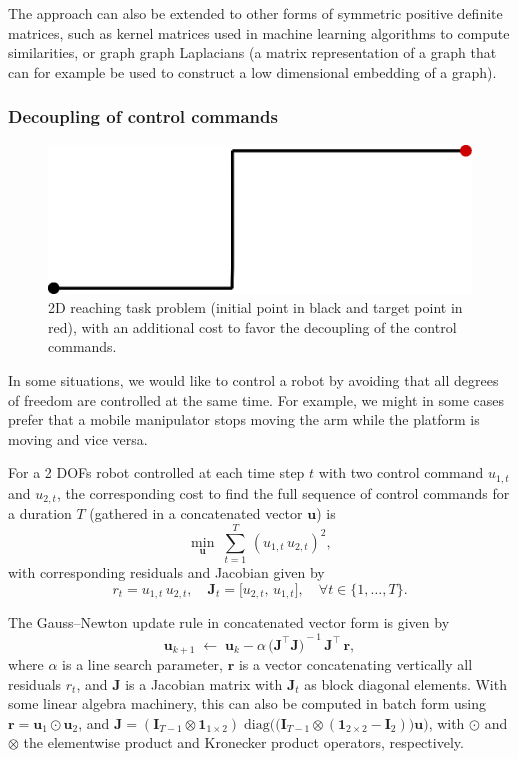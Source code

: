 \documentclass[10pt,a4paper]{article} %
\newcommand{\trsp}{{\scriptscriptstyle\top}}
\begin{document}
The approach can also be extended to other forms of symmetric positive definite matrices, such as kernel matrices used in machine learning algorithms to compute similarities, or graph graph Laplacians (a matrix representation of a graph that can for example be used to construct a low dimensional embedding of a graph).

\subsubsection{Decoupling of control commands}

\begin{figure}
\centering
\includegraphics[width=.20\textwidth]{images/iLQR_decoupling01.png}
\caption{\footnotesize
2D reaching task problem (initial point in black and target point in red), with an additional cost to favor the decoupling of the control commands.
}
\label{fig:iLQR_decoupling}
\end{figure}

In some situations, we would like to control a robot by avoiding that all degrees of freedom are controlled at the same time. For example, we might in some cases  prefer that a mobile manipulator stops moving the arm while the platform is moving and vice versa.

For a 2 DOFs robot controlled at each time step $t$ with two control command $u_{1,t}$ and $u_{2,t}$, the corresponding cost to find the full sequence of control commands for a duration $T$ (gathered in a concatenated vector $\bm{u}$) is
\begin{equation*}
	\min_{\bm{u}} \; \sum_{t=1}^T \, {(u_{1,t} \, u_{2,t})}^2,
\end{equation*}
with corresponding residuals and Jacobian given by 
\begin{equation*}
	r_t = u_{1,t} \, u_{2,t},
	\quad
	\bm{J}_t = \big[ u_{2,t}, \, u_{1,t} \big], 
	\quad 
	\forall t\in\{1,\ldots,T\}.
\end{equation*}

The Gauss--Newton update rule in concatenated vector form is given by
\begin{equation*}
	\bm{u}_{k+1} \;\leftarrow\; 
	\bm{u}_k - \alpha \, {\big( \bm{J}^\trsp \bm{J} \big)}^{\!-1} \, \bm{J}^\trsp \, \bm{r},
\end{equation*}
where $\alpha$ is a line search parameter, $\bm{r}$ is a vector concatenating vertically all residuals $r_t$, and $\bm{J}$ is a Jacobian matrix with $\bm{J}_t$ as block diagonal elements. With some linear algebra machinery, this can also be computed in batch form using $\bm{r} = \bm{u}_1 \odot \bm{u}_2$, and $\bm{J} = (\bm{I}_{T-1} \otimes \bm{1}_{1\times 2}) \; \text{diag}\Big(\big(\bm{I}_{T-1} \otimes (\bm{1}_{2\times 2}-\bm{I}_2)\big)\bm{u} \Big)$, with $\odot$ and $\otimes$ the elementwise product and Kronecker product operators, respectively. 
\end{document}
